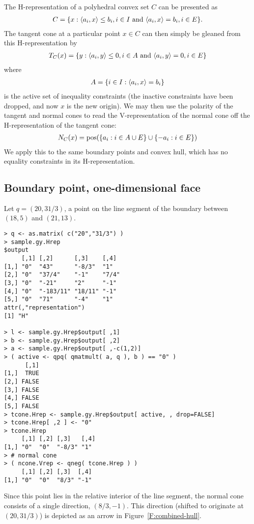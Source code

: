 The H-representation of a polyhedral convex set $C$ can be presented as
\begin{align*}
	C = \{ x: \langle a_i, x \rangle \leq b_i, i \in I \text{ and } 
				\langle a_i, x \rangle = b_i, i \in E \}.
\end{align*}
The tangent cone at a particular point $x \in C$ can then simply be gleaned from 
this H-representation by
\begin{align*}
	T_C(x) = \{ y: \langle a_i, y \rangle \leq 0, i \in A \text{ and } 
				\langle a_i, y \rangle = 0, i \in E \}
\end{align*}
where 
\begin{align*}
	A = \{ i \in I: \langle a_i, x \rangle = b_i \}
\end{align*}
is the active set of inequality constraints (the inactive constraints have been
 dropped, and now $x$ is the new origin).
We may then use the polarity of the tangent and normal cones to read the 
V-representation of the normal cone off the H-representation 
of the tangent cone:
\begin{align*}
	N_C(x) = \operatorname{pos}( \{ a_i: i \in A \cup E \} \cup \{ -a_i: i \in E \} )
\end{align*}
We apply this to the same boundary points and convex hull, which has no 
equality constraints in its H-representation.
\subsection{Boundary point, one-dimensional face} \label{S:ncone 1dim}
Let $q = (20, 31/3)$, a point on the line segment of the boundary
between $(18,5)$ and $(21,13)$.
\begin{verbatim}
> q <- as.matrix( c("20","31/3") )
> sample.gy.Hrep
$output
     [,1] [,2]      [,3]    [,4] 
[1,] "0"  "43"      "-8/3"  "1"  
[2,] "0"  "37/4"    "-1"    "7/4"
[3,] "0"  "-21"     "2"     "-1" 
[4,] "0"  "-183/11" "18/11" "-1" 
[5,] "0"  "71"      "-4"    "1"  
attr(,"representation")
[1] "H"

> l <- sample.gy.Hrep$output[ ,1]
> b <- sample.gy.Hrep$output[ ,2]
> a <- sample.gy.Hrep$output[ ,-c(1,2)]
> ( active <- qpq( qmatmult( a, q ), b ) == "0" )
      [,1]
[1,]  TRUE
[2,] FALSE
[3,] FALSE
[4,] FALSE
[5,] FALSE
> tcone.Hrep <- sample.gy.Hrep$output[ active, , drop=FALSE]
> tcone.Hrep[ ,2 ] <- "0"
> tcone.Hrep
     [,1] [,2] [,3]   [,4]
[1,] "0"  "0"  "-8/3" "1" 
> # normal cone
> ( ncone.Vrep <- qneg( tcone.Hrep ) )
     [,1] [,2] [,3]  [,4]
[1,] "0"  "0"  "8/3" "-1"
\end{verbatim}
Since this point lies in the relative interior of the line segment,
the normal cone consists of a single direction, $(8/3, -1)$.
This direction (shifted to originate at $(20,31/3)$) is depicted 
as an arrow in Figure~\ref{F:combined-hull}.


